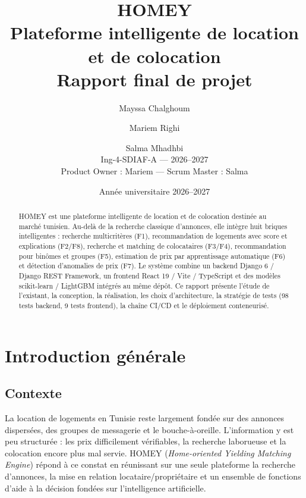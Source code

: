 \documentclass[11pt,a4paper]{report}
\title{\textbf{HOMEY}\\[6pt]
\large Plateforme intelligente de location et de colocation\\[4pt]
\normalsize Rapport final de projet}
\author{Mayssa Chalghoum \and Mariem Righi \and Salma Mhadhbi\\[4pt]
\small Ing-4-SDIAF-A --- 2026--2027\\
\small Product Owner : Mariem --- Scrum Master : Salma}
\date{Année universitaire 2026--2027}
\begin{document}
\maketitle
\thispagestyle{empty}

\begin{abstract}
\noindent HOMEY est une plateforme intelligente de location et de colocation destinée au marché
tunisien. Au-delà de la recherche classique d'annonces, elle intègre huit briques intelligentes :
recherche multicritères (F1), recommandation de logements avec score et explications (F2/F8),
recherche et matching de colocataires (F3/F4), recommandation pour binômes et groupes (F5),
estimation de prix par apprentissage automatique (F6) et détection d'anomalies de prix (F7).
Le système combine un backend Django 6 / Django REST Framework, un frontend React 19 / Vite /
TypeScript et des modèles scikit-learn / LightGBM intégrés au même dépôt. Ce rapport présente
l'étude de l'existant, la conception, la réalisation, les choix d'architecture, la stratégie de
tests (98 tests backend, 9 tests frontend), la chaîne CI/CD et le déploiement conteneurisé.
\end{abstract}

\tableofcontents
\newpage

\chapter{Introduction générale}

\section{Contexte}
La location de logements en Tunisie reste largement fondée sur des annonces dispersées, des
groupes de messagerie et le bouche-à-oreille. L'information y est peu structurée : les prix
difficilement vérifiables, la recherche laborueuse et la colocation encore plus mal servie.
HOMEY (\textit{Home-oriented Yielding Matching Engine}) répond à ce constat en réunissant sur une
seule plateforme la recherche d'annonces, la mise en relation locataire/propriétaire et un
ensemble de fonctions d'aide à la décision fondées sur l'intelligence artificielle.
\end{document}
